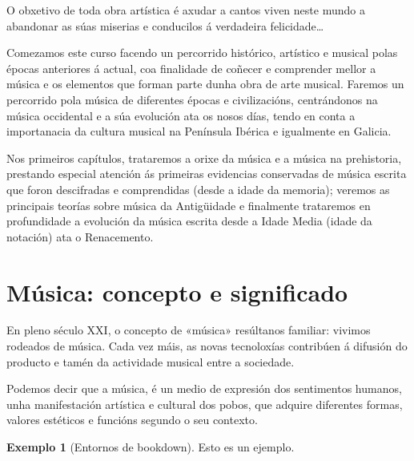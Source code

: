 \documentclass[a4paper, twoside]{templates/ociamthesis}
\theoremstyle{definition}
\theoremstyle{definition}
\newtheorem{example}{Exemplo}[chapter]
\theoremstyle{definition}
\theoremstyle{definition}
\theoremstyle{remark}
\begin{document}
\adjustmtc
{}

\begin{savequote}
O obxetivo de toda obra artística é axudar a cantos viven neste mundo a
abandonar as súas miserias e conducilos á verdadeira felicidade\ldots{}
\end{savequote}



Comezamos este curso facendo un percorrido histórico, artístico e musical polas épocas anteriores á actual, coa finalidade de coñecer e comprender mellor a música e os elementos que forman parte dunha obra de arte musical. Faremos un percorrido pola música de diferentes épocas e civilizacións, centrándonos na música occidental e a súa evolución ata os nosos días, tendo en conta a importanacia da cultura musical na Península Ibérica e igualmente en Galicia.

Nos primeiros capítulos, trataremos a orixe da música e a música na prehistoria, prestando especial atención ás primeiras evidencias conservadas de música escrita que foron descifradas e comprendidas (desde a idade da memoria); veremos as principais teorías sobre música da Antigüidade e finalmente trataremos en profundidade a evolución da música escrita desde a Idade Media (idade da notación) ata o Renacemento.

\hypertarget{muxfasica-concepto-e-significado}{%
\section*{Música: concepto e significado}\label{muxfasica-concepto-e-significado}}

En pleno século XXI, o concepto de «música» resúltanos familiar: vivimos rodeados de música. Cada vez máis, as novas tecnoloxías contribúen á difusión do producto e tamén da actividade musical entre a sociedade.

Podemos decir que a música, é un medio de expresión dos sentimentos humanos, unha manifestación artística e cultural dos pobos, que adquire diferentes formas, valores estéticos e funcións segundo o seu contexto.

\begin{example}[Entornos de bookdown]
\label{exm:foo} {} Esto es un ejemplo.
\end{example}
\end{document}
